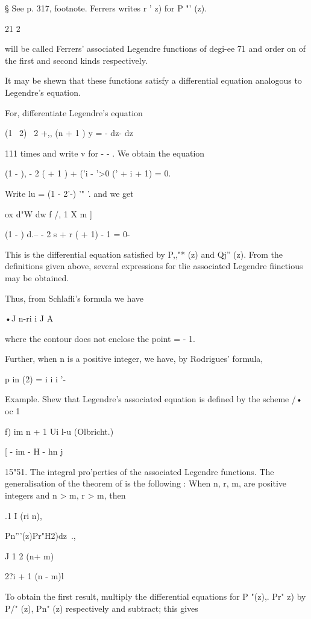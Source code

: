 {{{§ See p. 317, footnote. Ferrers writes r ' z) for P "' (z).

21 2

%
%

will be called Ferrers' associated Legendre functions of degi-ee 71
and order on of the first and second kinds respectively.

It may be shewn that these functions satisfy a differential equation
analogous to Legendre's equation.

For, differentiate Legendre's equation

(1 \ 2) \ 2 +,, (n + 1 ) y = - dz- dz

111 times and write v for - - . We obtain the equation

(1 - ), - 2 ( + 1 ) + ('i - '>0 (' + i + 1) = 0.

Write lu = (1 - 2'-) '" '. and we get

ox d"W dw f /, 1 X m ]

(1 - ) d.-- - 2 s + r ( + 1) - 1 = 0-

This is the differential equation satisfied by P,,"* (z) and Qj'' (z).
From the definitions given above, several expressions for tlie
associated Legendre fiinctious may be obtained.

Thus, from Schlafli's formula we have

•J n-ri i J A

where the contour does not enclose the point = - 1.

Further, when n is a positive integer, we have, by Rodrigues' formula,

p in (2) = i i i '-

Example. Shew that Legendre's associated equation is defined by the
scheme /• oc 1

f) im n + 1 Ui l-u (Olbricht.)

[ - im - H - hn j

15"51. The integral pro'perties of the associated Legendre functions.
The generalisation of the theorem of is the following : When
n, r, m, are positive integers and n > m, r > m, then

.1 I (ri n),

Pn'''(z)Pr"H2)dz\, .,

J 1 2 (n+ m)\

2?i + 1 (n - m)l

To obtain the first result, multiply the differential equations for P
"(z),. Pr" z) by P/" (z), Pn" (z) respectively and subtract; this
gives

}}}
